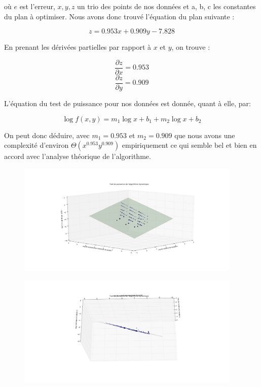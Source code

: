 \documentclass[a4paper, 12pt]{article} %
\begin{document}
    où $e$ est l'erreur, $x, y, z$ un trio des points de nos données et a, b, c les constantes du plan
    à optimiser. Nous avons donc trouvé l'équation du plan suivante :

    \begin{equation}
        z = 0.953x + 0.909y - 7.828
    \end{equation}

    En prenant les dérivées partielles par rapport à $x$ et $y$, on trouve : 

    \begin{equation}
        \frac{\partial z}{\partial x} = 0.953
    \end{equation}
    \begin{equation}
        \frac{\partial z}{\partial y} = 0.909
    \end{equation}

    L'équation du test de puissance pour nos données est donnée, quant à elle, par:

    \begin{equation}
        \log f(x,y) = m_{1}\log x + b_{1} + m_{2}\log x + b_{2}
    \end{equation}

    On peut donc déduire, avec $m_{1} = 0.953$ et $m_{2} = 0.909$ que nous avons une complexité
    d'environ $\Theta(x^{0.953}y^{0.909})$ empiriquement ce qui semble bel et bien en accord 
    avec l'analyse théorique de l'algorithme.

    \begin{figure}
    	\centering
        \includegraphics[width=0.95\textwidth]{Figure/AlgorithmeDynamique.png}
    \end{figure}

    \begin{figure}
    	\centering
        \includegraphics[width=0.95\textwidth]{Figure/AlgorithmeDynamique2.png}
    \end{figure}
\end{document}
